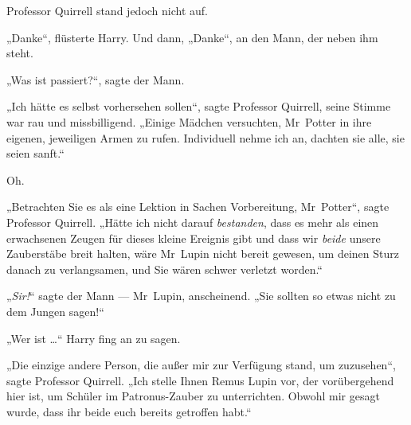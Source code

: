 Professor Quirrell stand jedoch nicht auf.

„Danke“, flüsterte Harry. Und dann,
„Danke“, an den Mann, der neben ihm steht.

„Was ist passiert?“, sagte der Mann.

„Ich hätte es selbst vorhersehen sollen“, sagte Professor Quirrell, seine Stimme war rau und missbilligend.
„Einige Mädchen versuchten, Mr~Potter in ihre eigenen, jeweiligen Armen zu rufen. Individuell nehme ich an, dachten sie alle, sie seien sanft.“

Oh.

„Betrachten Sie es als eine Lektion in Sachen Vorbereitung, Mr~Potter“, sagte Professor Quirrell.
„Hätte ich nicht darauf \emph{bestanden}, dass es mehr als einen erwachsenen Zeugen für dieses kleine Ereignis gibt und dass wir \emph{beide} unsere Zauberstäbe breit halten, wäre Mr~Lupin nicht bereit gewesen, um deinen Sturz danach zu verlangsamen, und Sie wären schwer verletzt worden.“

„\emph{Sir!}“ sagte der Mann — Mr~Lupin, anscheinend.
„Sie sollten so etwas nicht zu dem Jungen sagen!“

„Wer ist …“ Harry fing an zu sagen.

„Die einzige andere Person, die außer mir zur Verfügung stand, um zuzusehen“, sagte Professor Quirrell.
„Ich stelle Ihnen Remus Lupin vor, der vorübergehend hier ist, um Schüler im Patronus-Zauber zu unterrichten. Obwohl mir gesagt wurde, dass ihr beide euch bereits getroffen habt.“

